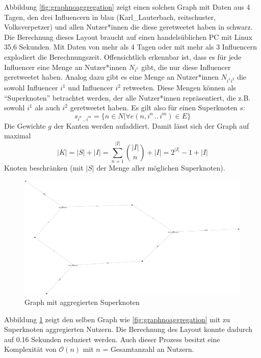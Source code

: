 Abbildung \ref{fig:graphnoaggregation} zeigt einen solchen Graph mit Daten aus 4 Tagen, den drei Influencern in blau (Karl\_Lauterbach, reitschuster, Volksverpetzer) und allen Nutzer*innen die diese \gls{geretweetet} haben in schwarz. Die Berechnung dieses Layout braucht auf einen handelsüblichen PC mit Linux 35,6 Sekunden. 
Mit Daten von mehr als 4 Tagen oder mit mehr als 3 Influencern explodiert die Berechnungszeit. 
Offensichtlich erkennbar ist, dass es  für jede Influencer eine Menge an Nutzer*innen $N_{i^x}$ gibt, die nur diese Influencer \gls{geretweetet} haben.
Analog dazu gibt es eine Menge an Nutzer*innen $N_{i^1i^2}$ die sowohl Influencer $i^1$ und Influencer $i^2$ retweeten. 
Diese Mengen können als "`Superknoten"' betrachtet werden, der alle Nutzer*innen repräsentiert, die z.B. sowohl $i^1$ als auch $i^2$ \gls{geretweetet} haben.
Es gilt also für einen Superknoten $s$:
 \begin{equation}
s_{i^n\,..\,i^m} = \{n\in N|\forall e(n,i^n\,..\,i^m)\in E\}
\end{equation}
Die Gewichte $g$ der Kanten werden aufaddiert. 
Damit lässt sich der Graph auf maximal
\begin{equation}
|K| = |S| + |I| = \sum_{n=1}^{|I|} \binom{|I|}{n} + |I| = 2^{|I|} - 1 + |I|
\end{equation}
Knoten beschränken (mit $|S|$ der Menge aller möglichen Superknoten).
\begin{figure}[h]
	\centering
	\includegraphics[width=0.7\linewidth]{images/GraphNoThreshold}
	\caption{Graph mit aggregierten Superknoten}
	\label{fig:graphnothreshold}
\end{figure}
Abbildung \ref{fig:graphnothreshold} zeigt den selben Graph wie \ref{fig:graphnoaggregation} mit zu Superknoten aggregierten Nutzern.
Die Berechnung des Layout konnte dadurch auf 0.16 Sekunden reduziert werden.
Auch dieser Prozess besitzt eine Komplexität von $\mathcal{O}(n)$ mit $n$ = Gesamtanzahl an Nutzern. 
